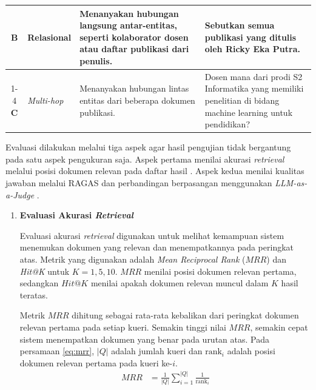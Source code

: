 \begin{enumerate}[label=\textbf{\arabic*.}, leftmargin=*, itemsep=10pt, listparindent=0.75cm]
\begin{longtable}{c p{} >{\raggedright\arraybackslash}p{} >{\raggedright\arraybackslash}p{}}
              \textbf{B}    & Relasional           & Menanyakan hubungan langsung antar-entitas, seperti kolaborator dosen atau daftar publikasi dari penulis.                                      & Sebutkan semua publikasi yang ditulis oleh Ricky Eka Putra.                                                                      \\ \cmidrule{1-4}
              \textbf{C}    & \textit{Multi-hop}   & Menanyakan hubungan lintas entitas dari beberapa dokumen publikasi.                                                                            & Dosen mana dari prodi S2 Informatika yang memiliki penelitian di bidang machine learning untuk pendidikan?                       \\
          \end{longtable}
          \endgroup

          Evaluasi dilakukan melalui tiga aspek agar hasil pengujian tidak bergantung pada satu aspek pengukuran saja. Aspek pertama menilai akurasi \textit{retrieval} melalui posisi dokumen relevan pada daftar hasil \citep{manning2008introduction}. Aspek kedua menilai kualitas jawaban melalui RAGAS \citep{es-etal-2024-ragas} dan perbandingan berpasangan menggunakan \textit{LLM-as-a-Judge} \citep{zheng2023judging}.

          \begin{enumerate}[label=\textbf{\alph*.}, leftmargin=0.75cm, itemsep=4pt, listparindent=0.75cm]

              \item \textbf{Evaluasi Akurasi \textit{Retrieval}}

                    Evaluasi akurasi \textit{retrieval} digunakan untuk melihat kemampuan sistem menemukan dokumen yang relevan dan menempatkannya pada peringkat atas. Metrik yang digunakan adalah \textit{Mean Reciprocal Rank} ($\textit{MRR}$) dan \textit{Hit@K} untuk $K = 1, 5, 10$. $\textit{MRR}$ menilai posisi dokumen relevan pertama, sedangkan $\textit{Hit@K}$ menilai apakah dokumen relevan muncul dalam $K$ hasil teratas.

                    Metrik $\textit{MRR}$ \citep{manning2008introduction} dihitung sebagai rata-rata kebalikan dari peringkat dokumen relevan pertama pada setiap kueri. Semakin tinggi nilai $\textit{MRR}$, semakin cepat sistem menempatkan dokumen yang benar pada urutan atas. Pada persamaan \eqref{eq:mrr}, $|Q|$ adalah jumlah kueri dan $\text{rank}_i$ adalah posisi dokumen relevan pertama pada kueri ke-$i$.
                    \begin{align}
                        \textit{MRR} & = \frac{1}{|Q|} \sum_{i=1}^{|Q|} \frac{1}{\text{rank}_i} \label{eq:mrr}
                    \end{align}


\end{enumerate}
\end{enumerate}
